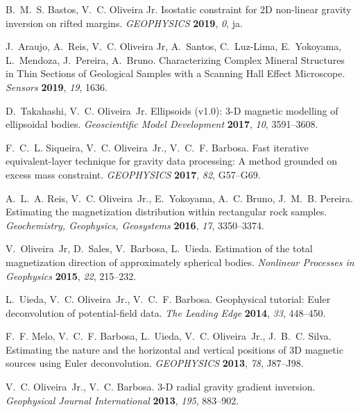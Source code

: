 
\nocite{*}

%
\begin{thebibliography}{10}

B.~M.~S. Bastos, V.~C. Oliveira{ }Jr. Isostatic constraint for 2D non-linear
  gravity inversion on rifted margins. \emph{GEOPHYSICS} \textbf{2019},
  \emph{0}, ja.

J.~Araujo, A.~Reis, V.~C. Oliveira{ }Jr, A.~Santos, C.~Luz-Lima, E.~Yokoyama,
  L.~Mendoza, J.~Pereira, A.~Bruno. Characterizing Complex Mineral Structures
  in Thin Sections of Geological Samples with a Scanning Hall Effect
  Microscope. \emph{Sensors} \textbf{2019}, \emph{19}, 1636.

D.~Takahashi, V.~C. Oliveira~Jr. Ellipsoids (v1.0): 3-{D} magnetic modelling of
  ellipsoidal bodies. \emph{Geoscientific Model Development} \textbf{2017},
  \emph{10}, 3591--3608.

F.~C.~L. Siqueira, V.~C. Oliveira~Jr., V.~C.~F. Barbosa. Fast iterative
  equivalent-layer technique for gravity data processing: {A} method grounded
  on excess mass constraint. \emph{GEOPHYSICS} \textbf{2017}, \emph{82},
  G57--G69.

A.~L.~A. Reis, V.~C. Oliveira~Jr., E.~Yokoyama, A.~C. Bruno, J.~M.~B. Pereira.
  Estimating the magnetization distribution within rectangular rock samples.
  \emph{Geochemistry, Geophysics, Geosystems} \textbf{2016}, \emph{17},
  3350--3374.

V.~Oliveira~Jr, D.~Sales, V.~Barbosa, L.~Uieda. Estimation of the total
  magnetization direction of approximately spherical bodies. \emph{Nonlinear
  Processes in Geophysics} \textbf{2015}, \emph{22}, 215--232.

L.~Uieda, V.~C. Oliveira~Jr., V.~C.~F. Barbosa. Geophysical tutorial: {Euler}
  deconvolution of potential-field data. \emph{The Leading Edge} \textbf{2014},
  \emph{33}, 448--450.

F.~F. Melo, V.~C.~F. Barbosa, L.~Uieda, V.~C. Oliveira~Jr., J.~B.~C. Silva.
  Estimating the nature and the horizontal and vertical positions of 3D
  magnetic sources using {Euler} deconvolution. \emph{GEOPHYSICS}
  \textbf{2013}, \emph{78}, J87--J98.

V.~C. Oliveira~Jr., V.~C. Barbosa. 3-{D} radial gravity gradient inversion.
  \emph{Geophysical Journal International} \textbf{2013}, \emph{195}, 883--902.


\end{thebibliography}
